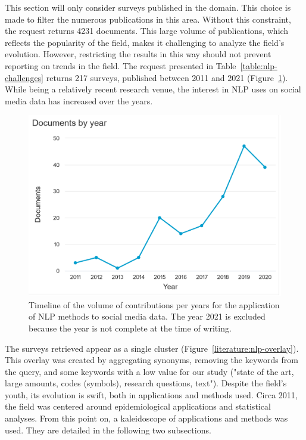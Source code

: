 This section will only consider surveys published in the domain.
This choice is made to filter the numerous publications in this area.
Without this constraint, the request returns 4231 documents.
This large volume of publications, which reflects the popularity of the field, makes it challenging to analyze the field's evolution.
However, restricting the results in this way should not prevent reporting on trends in the field.
The request presented in Table~\ref{table:nlp-challenges} returns 217 surveys, published between 2011 and 2021 (Figure~\ref{literature:nlp-hist}).
While being a relatively recent research venue, the interest in NLP uses on social media data has increased over the years.

\begin{figure}[thb]
    \centering
    \includegraphics[width=\textwidth]{figures/chap-2/nlp-hist.pdf}
    \caption{Timeline of the volume of contributions per years for the application of NLP methods to social media data. The year 2021 is excluded because the year is not complete at the time of writing.}
    \label{literature:nlp-hist}
\end{figure}

The surveys retrieved appear as a single cluster (Figure~\ref{literature:nlp-overlay}).
This overlay was created by aggregating synonyms, removing the keywords from the query, and some keywords with a low value for our study ("state of the art, large amounts, codes (symbols), research questions, text").
Despite the field's youth, its evolution is swift, both in applications and methods used.
Circa 2011, the field was centered around epidemiological applications and statistical analyses.
From this point on, a kaleidoscope of applications and methods was used.
They are detailed in the following two subsections.

